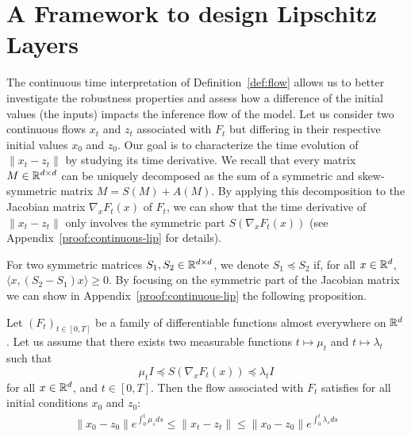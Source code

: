 \section{A Framework to design Lipschitz Layers}
\label{section:global_framework}


The continuous time interpretation of Definition~\ref{def:flow} allows us to better investigate the robustness properties and assess how a difference of the initial values (the inputs) impacts the inference flow of the model. Let us consider two continuous flows $x_t$ and $z_t$ associated with $F_t$ but differing in their respective initial values $x_0$ and $z_0$. Our goal is to characterize the time evolution of $\lVert x_t-z_t \rVert$ by studying its  time derivative. We recall that  every matrix $M\in\mathbb{R}^{d\times d}$ can be uniquely decomposed as the sum of a symmetric and skew-symmetric matrix $M = S(M) + A(M)$. By applying this decomposition to the Jacobian matrix $\nabla_x F_t(x)$ of $F_t$, we can show that the time derivative of $\lVert x_t-z_t \rVert$ only involves the symmetric part  $S(\nabla_x F_t(x))$ (see Appendix~\ref{proof:continuous-lip} for details). 

For two symmetric matrices $S_1,S_2\in\mathbb{R}^{d\times d}$,  we denote $S_1\preceq S_2$ if, for all $x\in\mathbb{R}^d$, $\langle x,(S_2-S_1)x\rangle\geq 0$. By focusing on the symmetric part of the Jacobian matrix we can show in Appendix~\ref{proof:continuous-lip} the following proposition.
\begin{prop}
\label{prop:continuous-lip}
Let $(F_{t})_{t\in[0,T]}$ be a family of differentiable  functions almost everywhere on $\mathbb{R}^d$.
Let us assume that there exists two measurable functions $t\mapsto \mu_t$ and  $t\mapsto \lambda_t$ such that
$$\mu_t I\preceq S(\nabla_xF_{t}(x))\preceq \lambda_tI$$
for all $x\in\mathbb{R}^d$, and $t\in [ 0,T]$. Then the flow associated with $F_t$ satisfies for all initial conditions $x_0$ and $z_0$:
\begin{align*}
  \lVert x_0-z_0 \rVert e^{\int_0^t\mu_s ds}\leq \lVert x_t-z_t \rVert\leq \lVert x_0-z_0 \rVert e^{\int_0^t\lambda_s ds}
\end{align*}
\end{prop}

